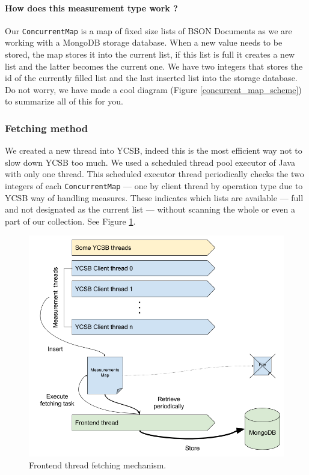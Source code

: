 \documentclass[a4paper,11pt]{report}
\begin{document}
\paragraph{How does this measurement type work ?}  Our \texttt{ConcurrentMap} is a map of fixed size lists of BSON Documents as we are working with a MongoDB storage database. When a new value needs to be stored, the map stores it into the current list, if this list is full it creates a new list and the latter becomes the current one. We have two integers that stores the id of the currently filled list and the last inserted list into the storage database. Do not worry, we have made a cool diagram (Figure \ref{concurrent_map_scheme}) to summarize all of this for you.

\subsubsection{Fetching method}

We created a new thread into YCSB, indeed this is the most efficient way not to slow down YCSB too much. We used a scheduled thread pool executor of Java with only one thread. This scheduled executor thread periodically checks the two integers of each \texttt{ConcurrentMap} --- one by client thread by operation type due to YCSB way of handling measures. These indicates which lists are available --- full and not designated as the current list --- without scanning the whole or even a part of our collection. See Figure \ref{threads_report}.

\begin{figure}[ht]
\begin{center}
\includegraphics[width=1\linewidth]{images/threads_report.png}
\caption{Frontend thread fetching mechanism.}
\label{threads_report}
\end{center}
\end{figure}
\end{document}
